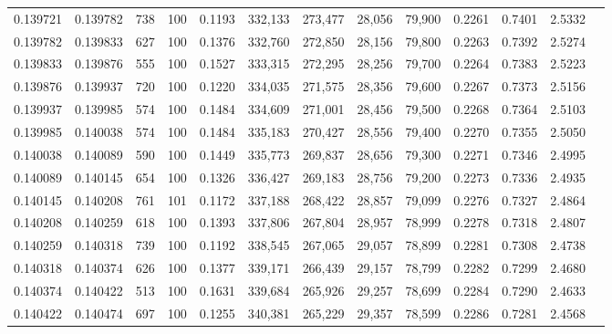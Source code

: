 \begin{tabular}{rrrrrrrrrrrrr}
0.139721 & 0.139782 &   738 & 100 &                                     0.1193 & 332,133 & 273,477 &  28,056 &  79,900 & 0.2261 & 0.7401 & 2.5332 \\
0.139782 & 0.139833 &   627 & 100 &                                     0.1376 & 332,760 & 272,850 &  28,156 &  79,800 & 0.2263 & 0.7392 & 2.5274 \\
0.139833 & 0.139876 &   555 & 100 &                                     0.1527 & 333,315 & 272,295 &  28,256 &  79,700 & 0.2264 & 0.7383 & 2.5223 \\
0.139876 & 0.139937 &   720 & 100 &                                     0.1220 & 334,035 & 271,575 &  28,356 &  79,600 & 0.2267 & 0.7373 & 2.5156 \\
0.139937 & 0.139985 &   574 & 100 &                                     0.1484 & 334,609 & 271,001 &  28,456 &  79,500 & 0.2268 & 0.7364 & 2.5103 \\
0.139985 & 0.140038 &   574 & 100 &                                     0.1484 & 335,183 & 270,427 &  28,556 &  79,400 & 0.2270 & 0.7355 & 2.5050 \\
0.140038 & 0.140089 &   590 & 100 &                                     0.1449 & 335,773 & 269,837 &  28,656 &  79,300 & 0.2271 & 0.7346 & 2.4995 \\
0.140089 & 0.140145 &   654 & 100 &                                     0.1326 & 336,427 & 269,183 &  28,756 &  79,200 & 0.2273 & 0.7336 & 2.4935 \\
0.140145 & 0.140208 &   761 & 101 &                                     0.1172 & 337,188 & 268,422 &  28,857 &  79,099 & 0.2276 & 0.7327 & 2.4864 \\
0.140208 & 0.140259 &   618 & 100 &                                     0.1393 & 337,806 & 267,804 &  28,957 &  78,999 & 0.2278 & 0.7318 & 2.4807 \\
0.140259 & 0.140318 &   739 & 100 &                                     0.1192 & 338,545 & 267,065 &  29,057 &  78,899 & 0.2281 & 0.7308 & 2.4738 \\
0.140318 & 0.140374 &   626 & 100 &                                     0.1377 & 339,171 & 266,439 &  29,157 &  78,799 & 0.2282 & 0.7299 & 2.4680 \\
0.140374 & 0.140422 &   513 & 100 &                                     0.1631 & 339,684 & 265,926 &  29,257 &  78,699 & 0.2284 & 0.7290 & 2.4633 \\
0.140422 & 0.140474 &   697 & 100 &                                     0.1255 & 340,381 & 265,229 &  29,357 &  78,599 & 0.2286 & 0.7281 & 2.4568 \\

\end{tabular}
